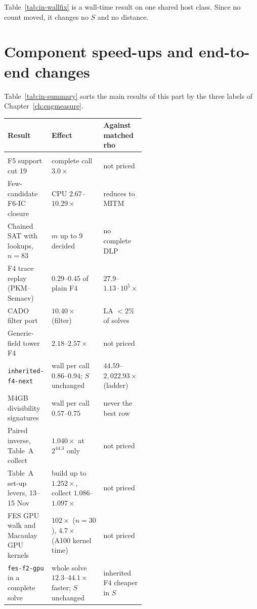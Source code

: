 \noindent Table~\ref{tab:in-wallfix} is a wall-time result on one shared
host class. Since no count moved, it changes no $S$ and no distance.

\section{Component speed-ups and end-to-end changes}\label{sec:in-summary}

Table~\ref{tab:in-summary} sorts the main results of this part by the three
labels of Chapter~\ref{ch:engmeasure}.

\begin{table}[t]
\centering\small
\begin{tabularx}{\linewidth}{@{}>{\raggedright}p{0.32\linewidth}>{\raggedright}X>{\raggedright\arraybackslash}p{0.22\linewidth}@{}}
\toprule
Result & Effect & Against matched rho \\
\midrule
\multicolumn{3}{@{}l}{\emph{Component speed-ups (identical outputs, stage unit)}} \\
F5 support cut 19 & complete call $3.0\times$ & not priced \\
Few-candidate F6-IC closure & CPU $2.67$--$10.29\times$ & reduces to MITM \\
Chained SAT with lookups, $n=83$ & $m$ up to 9 decided & no complete DLP \\
F4 trace replay (PKM--Semaev) & $0.29$--$0.45$ of plain F4 & $27.9$--$1.13\cdot10^5\times$ \\
CADO filter port & $10.40\times$ (filter) & LA $<2\%$ of solves \\
Generic-field tower F4 & $2.18$--$2.57\times$ & not priced \\
\texttt{inherited-f4-next} & wall per call $0.86$--$0.94$; $S$ unchanged & $44.59$--$2{,}022.93\times$ (ladder) \\
M4GB divisibility signatures & wall per call $0.57$--$0.75$ & never the best row \\
Paired inverse, Table~A collect & $1.040\times$ at $2^{44.3}$ only & not priced \\
Table~A set-up levers, 13--15 Nov & build up to $1.252\times$, collect $1.086$--$1.097\times$ & not priced \\
FES GPU walk and Macaulay GPU kernels & $102\times$ ($n=30$), $4.7\times$ (A100 kernel time) & not priced \\
\texttt{fes-f2-gpu} in a complete solve & whole solve $12.3$--$44.1\times$ faster; $S$ unchanged & inherited F4 cheaper in $S$ \\

\end{tabularx}
\end{table}
